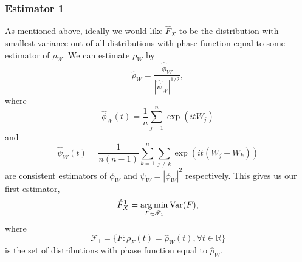 	\subsubsection{Estimator 1}
	As mentioned above, ideally we would like $\hat{F}_X$ to be the distribution with smallest variance out of all distributions with phase function equal to some estimator of $\rho_W$. We can estimate $\rho_W$ by
	\begin{equation}
		\hat{\rho}_W = \frac{\hat{\phi}_W}{\left|\hat{\psi}_W\right|^{1/2}},
	\end{equation}
	where
	\begin{equation}
	\label{eq:define hat phi W}
		\hat{\phi}_W(t) = \frac{1}{n}\sum_{j = 1}^n \exp(it W_j)
	\end{equation}
	and 
	\begin{equation}
	\label{eq:define hat psi W}
		\hat{\psi}_W(t) = \frac{1}{n(n-1)} \sum_{k=1}^n \sum_{j \neq k} \exp(it (W_j - W_k))
	\end{equation}
	are consistent estimators of $\phi_W$ and $\psi_W = |\phi_W|^2$ respectively. This gives us our first estimator,
	\begin{equation}
		\hat{F}_X^1 = \operatorname*{arg\,min}_{F \in \mathscr{F}_1} \mathrm{Var}(F),
	\end{equation}
	where 
	\begin{equation}
		\mathscr{F}_1 = \{F: \rho_F(t) = \hat{\rho}_W(t), \forall t \in \mathbb{R}\}
	\end{equation}
	is the set of distributions with phase function equal to $\hat{\rho}_W$.


